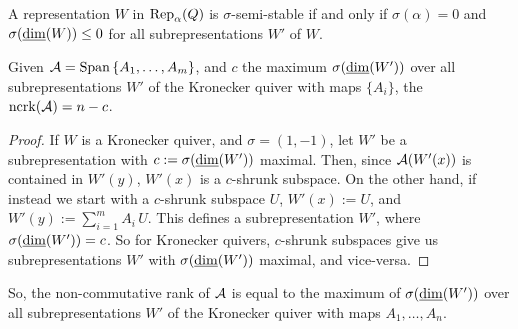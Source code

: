 \begin{proposition}
A representation $W$ in $\operatorname{Rep}_\alpha(Q)$ is $\sigma$-semi-stable if and only if $\sigma(\alpha)=0$ and $\sigma(\underline{\rm dim}(W))\leq 0$ for all subrepresentations $W'$ of $W$.
\end{proposition}

\begin{proposition}\label{cshrunksubrep}
    Given $\mathcal{A}=\operatorname{Span}{\{A_1,\ldots,A_m\}}$, and $c$ the maximum $\sigma(\underline{\rm dim}(W'))$ over all subrepresentations $W'$ of the Kronecker quiver with maps $\{A_i\}$, the $\operatorname{ncrk}(\mathcal{A})=n-c$.
\end{proposition} 

\begin{proof}
If $W$ is a Kronecker quiver, and $\sigma=(1,-1)$, let $W'$ be a subrepresentation with $c:=\sigma(\underline{\rm dim}(W'))$ maximal. Then, since $\mathcal{A}(W'(x))$ is contained in $W'(y)$, $W'(x)$ is a $c$-shrunk subspace. On the other hand, if instead we start with a $c$-shrunk subspace $U$,  $W'(x):=U$, and $W'(y):=\sum_{i=1}^{m}A_i\, U$. This defines a subrepresentation $W'$, where $\sigma(\underline{\rm dim}(W'))=c$. So for Kronecker quivers, $c$-shrunk subspaces give us subrepresentations $W'$ with $\sigma(\underline{\rm dim}(W'))$ maximal, and vice-versa. 
\end{proof}

So, the non-commutative rank of $\mathcal{A}$ is equal to the maximum of $\sigma(\underline{\rm dim}(W'))$ over all subrepresentations $W'$ of the Kronecker quiver with maps $A_1,\ldots,A_n$.


